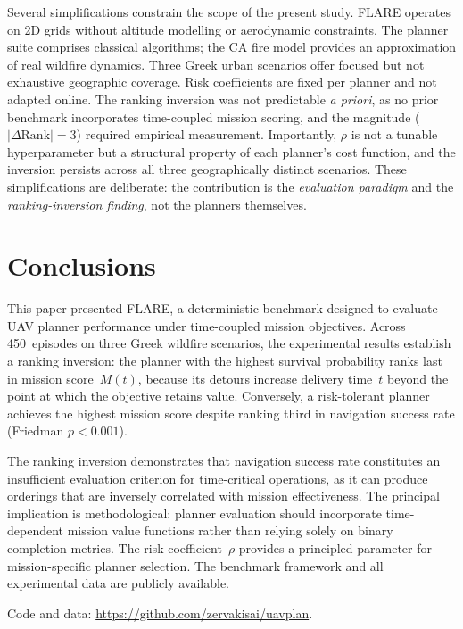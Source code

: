 \documentclass[drones,article,submit,moreauthors]{Definitions/mdpi}
\begin{document}
Several simplifications constrain the scope of the present study.
FLARE operates on 2D grids without altitude modelling or aerodynamic
constraints. The planner suite comprises classical algorithms; the CA
fire model provides an approximation of real wildfire dynamics. Three
Greek urban scenarios offer focused but not exhaustive geographic
coverage. Risk coefficients are fixed per planner and not adapted
online. The ranking inversion was not predictable \emph{a priori},
as no prior benchmark incorporates time-coupled mission scoring, and
the magnitude ($|\Delta\text{Rank}|{=}3$) required empirical
measurement. Importantly, $\rho$ is not a tunable hyperparameter
but a structural property of each planner's cost function, and
the inversion persists across all three geographically distinct
scenarios. These simplifications are deliberate: the contribution
is the \emph{evaluation paradigm} and the \emph{ranking-inversion
finding}, not the planners themselves.

\section{Conclusions}\label{sec:conclusions}

This paper presented FLARE, a deterministic benchmark designed to
evaluate UAV planner performance under time-coupled mission objectives.
Across 450~episodes on three Greek wildfire scenarios, the experimental
results establish a ranking inversion: the planner with the highest
survival probability ranks last in mission score~$M(t)$, because its
detours increase delivery time~$t$ beyond the point at which the
objective retains value. Conversely, a risk-tolerant planner achieves
the highest mission score despite ranking third in navigation success
rate (Friedman $p < 0.001$).

The ranking inversion demonstrates that navigation success rate
constitutes an insufficient evaluation criterion for time-critical
operations, as it can produce orderings that are inversely correlated
with mission effectiveness. The principal implication is methodological:
planner evaluation should incorporate time-dependent mission value
functions rather than relying solely on binary completion metrics.
The risk coefficient~$\rho$ provides a principled parameter for
mission-specific planner selection. The benchmark framework and all
experimental data are publicly available.

Code and data: \url{https://github.com/zervakisai/uavplan}.
\end{document}
